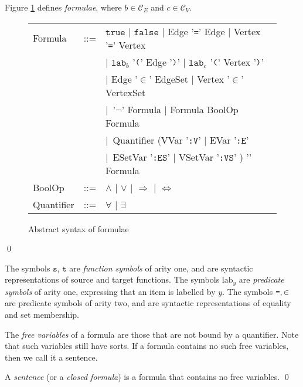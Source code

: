 \documentclass{llncs}
\newcommand{\mt}[1]{\text{\tt{#1}}}
\begin{document}
	
	\begin{definition}[Formulae]\label{defn:app:formulae}\rm
		Figure \ref{fig:app:ms_formula_syntax} defines \emph{formulae}, where $b \in \mathcal{C}_E$ and $c \in \mathcal{C}_V$.

	\begin{figure}[htb]
	\renewcommand{\arraystretch}{1.2}
	\begin{center}
	\begin{tabular}{lcl}
	Formula & ::= & $\mathtt{true}$ $\mid$ $\mathtt{false}$ $\mid$ Edge '\verb#=#' Edge $\mid$ Vertex '\verb#=#' Vertex\\
	&& $\mid$ $\mathtt{lab}_b$ '$\mt{(}$' Edge '$\mt{)}$' $\mid$ $\mathtt{lab}_c$ '$\mt{(}$' Vertex '$\mt{)}$' \\
	&& $\mid$ Edge '$\in$' EdgeSet $\mid$ Vertex '$\in$' VertexSet \\
	&& $\mid$\ '$\neg$' Formula $\mid$ Formula BoolOp Formula  \\
	&& $\mid$\ Quantifier (VVar '\texttt{:}$\mathtt{V}$' $\mid$ EVar '\texttt{:}$\mathtt{E}$'\\
	&& \hspace{0.25in} $\mid$\ ESetVar '\texttt{:}$\mathtt{ES}$' $\mid$ VSetVar '\texttt{:}$\mathtt{VS}$' ) '\mt{.}' Formula \\
	BoolOp & ::= & $\wedge$ $\mid$ $\vee$ $\mid$ $\Rightarrow$ $\mid$ $\Leftrightarrow$ \\
	Quantifier & ::= & $\forall$ $\mid$ $\exists$
	\end{tabular}
	\end{center}
	\caption{Abstract syntax of formulae}\label{fig:app:ms_formula_syntax}
	\end{figure}

	\qed
	\end{definition}
	
The symbols $\mathtt{s}$, $\mathtt{t}$ are \emph{function symbols} of arity one, and are syntactic representations of source and target functions. The symbols $\text{lab}_y$ are \emph{predicate symbols} of arity one, expressing that an item is labelled by $y$. The symbols $\mt{=}, \in$ are predicate symbols of arity two, and are syntactic representations of equality and set membership.
	
	The \emph{free variables} of a formula are those that are not bound by a quantifier. Note that such variables still have sorts. If a formula contains no such free variables, then we call it a sentence.

	\begin{definition}[Sentence]\label{defn:sentence}\rm
		A \emph{sentence} (or a \emph{closed formula}) is a formula that contains no free variables.
	\qed
	\end{definition}
	
\end{document}
